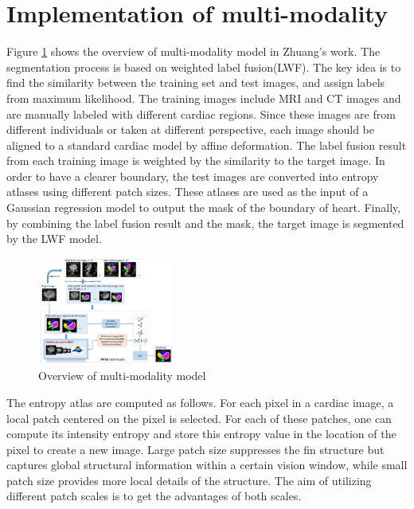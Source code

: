 \documentclass[10pt,sigconf,letterpaper,nonacm]{acmart}
\begin{document}
\section{Implementation of multi-modality}
 Figure \ref{yihao_overview} shows the overview of multi-modality model in Zhuang's work\cite{zhuang2016multi}. The segmentation process is based on weighted label fusion(LWF). The key idea is to find the similarity between the training set and test images, and assign labels from maximum likelihood. The training images include MRI and CT images and are manually labeled with different cardiac regions. Since these images are from different individuals or taken at different perspective, each image should be aligned to a standard cardiac model by affine deformation. The label fusion result from each training image is weighted by the similarity to the target image. In order to have a clearer boundary, the test images are converted into entropy atlases using different patch sizes. These atlases are used as the input of a Gaussian regression model to output the mask of the boundary of heart. Finally, by combining the label fusion result and the mask, the target image is segmented by the LWF model.
 
\begin{figure}
	\centering
	\includegraphics[width=0.4\textwidth]{images/yihao_overview.png}
	\caption{Overview of multi-modality model}
	\label{yihao_overview}
\end{figure} 
 
 The entropy atlas are computed as follows\cite{wachinger2012entropy}. For each pixel in a cardiac image, a local patch centered on the pixel is selected. For each of these patches, one can compute its intensity entropy and store this entropy value in the location of the pixel to create a new image. Large patch size suppresses the fin structure but captures global structural information within a certain vision window, while small patch size provides more local details of the structure. The aim of utilizing different patch scales is to get the advantages of both scales.
\end{document}
